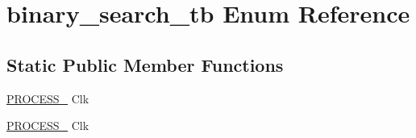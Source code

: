 \hypertarget{enumbinary__search__tb}{}\section{binary\+\_\+search\+\_\+tb Enum Reference}
\label{enumbinary__search__tb}
\subsection*{Static Public Member Functions}
\begin{DoxyCompactItemize}
\item 
\mbox{\hyperlink{enumbinary__search__tb_a75170e052c291ff4de20a9154177d7ab}{P\+R\+O\+C\+E\+S\+S\+\_}} Clk
\item 
\mbox{\hyperlink{enumbinary__search__tb_a663d8c3c055c8dbfef5b94aeffb17fec}{P\+R\+O\+C\+E\+S\+S\+\_}} Clk
\end{DoxyCompactItemize}
